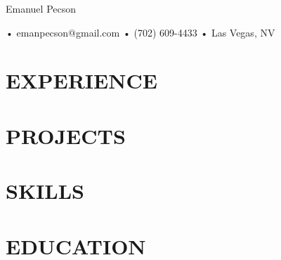 \documentclass[letterpaper,10pt]{article}
\begin{document}
\begin{center}
  {\fontsize{20}{20}\robotoregular Emanuel Pecson} \\

	\vspace{0.5em}

	\hspace{0.6em}•\hspace{0.6em}
	emanpecson@gmail.com
	\hspace{0.6em}•\hspace{0.6em}
	(702) 609-4433
	\hspace{0.6em}•\hspace{0.6em}
	Las Vegas, NV
\end{center}

\section*{EXPERIENCE}




\section*{PROJECTS}


% 

\section*{SKILLS}


\section*{EDUCATION}

\end{document}
